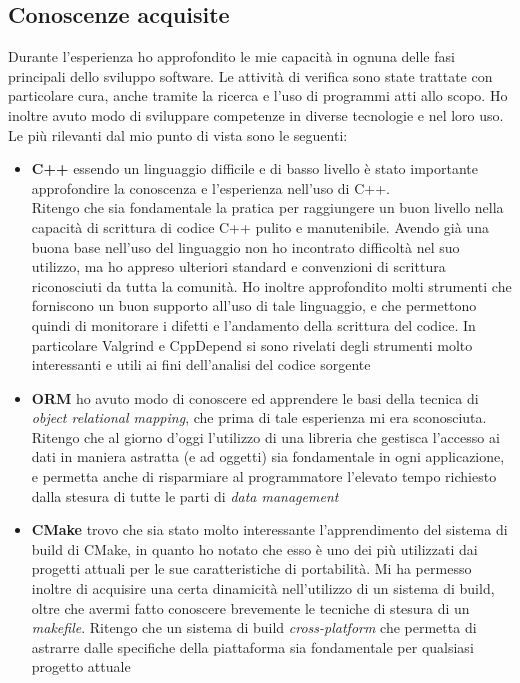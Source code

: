 \subsection{Conoscenze acquisite}
Durante l'esperienza ho approfondito le mie capacità in ognuna delle fasi principali dello sviluppo software. Le attività di verifica sono state trattate con particolare cura, anche tramite la ricerca e l'uso di programmi atti allo scopo. Ho inoltre avuto modo di sviluppare competenze in diverse tecnologie e nel loro uso.
Le più rilevanti dal mio punto di vista sono le seguenti:
\begin{itemize}
	\item \textbf{C++} essendo un linguaggio difficile e di basso livello è stato importante approfondire la conoscenza e l'esperienza nell'uso di C++. \\ Ritengo che sia fondamentale la pratica per raggiungere un buon livello nella capacità di scrittura di codice C++ pulito e manutenibile. Avendo già una buona base nell'uso del linguaggio non ho incontrato difficoltà nel suo utilizzo, ma ho appreso ulteriori standard e convenzioni di scrittura riconosciuti da tutta la comunità. Ho inoltre approfondito molti strumenti che forniscono un buon supporto all'uso di tale linguaggio, e che permettono quindi di monitorare i difetti e l'andamento della scrittura del codice. In particolare Valgrind e CppDepend si sono rivelati degli strumenti molto interessanti e utili ai fini dell'analisi del codice sorgente
	\item \textbf{ORM} ho avuto modo di conoscere ed apprendere le basi della tecnica di \textit{object relational mapping}, che prima di tale esperienza mi era sconosciuta. Ritengo che al giorno d'oggi l'utilizzo di una libreria che gestisca l'accesso ai dati in maniera astratta (e ad oggetti) sia fondamentale in ogni applicazione, e permetta anche di risparmiare al programmatore l'elevato tempo richiesto dalla stesura di tutte le parti di \textit{data management}
	\item \textbf{CMake} trovo che sia stato molto interessante l'apprendimento del sistema di build di CMake, in quanto ho notato che esso è uno dei più utilizzati dai progetti attuali per le sue caratteristiche di portabilità. Mi ha permesso inoltre di acquisire una certa dinamicità nell'utilizzo di un sistema di build, oltre che avermi fatto conoscere brevemente le tecniche di stesura di un \textit{makefile}. Ritengo che un sistema di build \textit{cross-platform} che permetta di astrarre dalle specifiche della piattaforma sia fondamentale per qualsiasi progetto attuale

\end{itemize}
